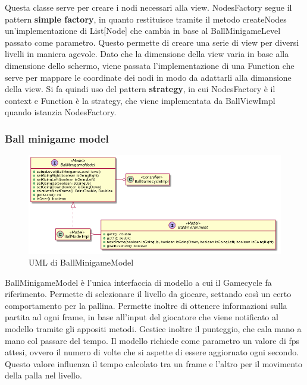 \documentclass[a4paper,12pt]{report}
\begin{document}
    Questa classe serve per creare i nodi necessari alla view.
    NodesFactory segue il pattern \textbf{simple factory}, in quanto restituisce tramite il metodo createNodes un'implementazione di List[Node] che cambia in base al BallMinigameLevel passato come parametro.
    Questo permette di creare una serie di view per diversi livelli in maniera agevole.
    Dato che la dimensione della view varia in base alla dimensione dello schermo, viene passata l'implementazione di una Function che serve per mappare le coordinate dei nodi in modo da adattarli alla dimansione della view.
    Si fa quindi uso del pattern \textbf{strategy}, in cui NodesFactory è il context e Function è la strategy, che viene implementata da BallViewImpl quando istanzia NodesFactory.

    \subsubsection{Ball minigame model}
    \begin{figure}[h]
    \centering{}
    \includegraphics[width=\textwidth]{images/freddi/BallMinigameModel.png}
    \caption{UML di BallMinigameModel}
    \end{figure}

    BallMinigameModel è l'unica interfaccia di modello a cui il Gamecycle fa riferimento.
    Permette di selezionare il livello da giocare, settando così un certo comportamento per la pallina.
    Permette inoltre di ottenere informazioni sulla partita ad ogni frame, in base all'input del giocatore che viene notificato al modello tramite gli appositi metodi.
    Gestice inoltre il punteggio, che cala mano a mano col passare del tempo.
    Il modello richiede come parametro un valore di fps attesi, ovvero il numero di volte che si aspette di essere aggiornato ogni secondo.
    Questo valore influenza il tempo calcolato tra un frame e l'altro per il movimento della palla nel livello.
\end{document}
